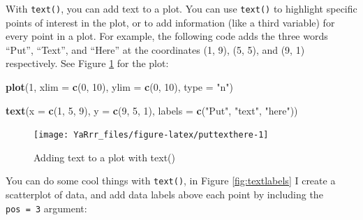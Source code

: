 \documentclass[]{book}
\newenvironment{Shaded}{\begin{snugshade}}{\end{snugshade}}
\newcommand{\KeywordTok}[1]{\textcolor[rgb]{0.13,0.29,0.53}{\textbf{#1}}}
\newcommand{\DataTypeTok}[1]{\textcolor[rgb]{0.13,0.29,0.53}{#1}}
\newcommand{\DecValTok}[1]{\textcolor[rgb]{0.00,0.00,0.81}{#1}}
\newcommand{\StringTok}[1]{\textcolor[rgb]{0.31,0.60,0.02}{#1}}
\newcommand{\NormalTok}[1]{#1}
\theoremstyle{definition}
\theoremstyle{definition}
\theoremstyle{remark}
\begin{document}
With \texttt{text()}, you can add text to a plot. You can use
\texttt{text()} to highlight specific points of interest in the plot, or
to add information (like a third variable) for every point in a plot.
For example, the following code adds the three words ``Put'', ``Text'',
and ``Here'' at the coordinates (1, 9), (5, 5), and (9, 1) respectively.
See Figure \ref{fig:puttexthere} for the plot:

\begin{Shaded}
\begin{Highlighting}[]
\KeywordTok{plot}\NormalTok{(}\DecValTok{1}\NormalTok{, }
     \DataTypeTok{xlim =} \KeywordTok{c}\NormalTok{(}\DecValTok{0}\NormalTok{, }\DecValTok{10}\NormalTok{), }
     \DataTypeTok{ylim =} \KeywordTok{c}\NormalTok{(}\DecValTok{0}\NormalTok{, }\DecValTok{10}\NormalTok{), }
     \DataTypeTok{type =} \StringTok{"n"}\NormalTok{)}

\KeywordTok{text}\NormalTok{(}\DataTypeTok{x =} \KeywordTok{c}\NormalTok{(}\DecValTok{1}\NormalTok{, }\DecValTok{5}\NormalTok{, }\DecValTok{9}\NormalTok{),}
     \DataTypeTok{y =} \KeywordTok{c}\NormalTok{(}\DecValTok{9}\NormalTok{, }\DecValTok{5}\NormalTok{, }\DecValTok{1}\NormalTok{),}
     \DataTypeTok{labels =} \KeywordTok{c}\NormalTok{(}\StringTok{"Put"}\NormalTok{, }\StringTok{"text"}\NormalTok{, }\StringTok{"here"}\NormalTok{))}
\end{Highlighting}
\end{Shaded}

\begin{figure}

{\centering \texttt{[image: YaRrr\_files/figure-latex/puttexthere-1]} 

}

\caption{Adding text to a plot with text()}\label{fig:puttexthere}
\end{figure}

You can do some cool things with \texttt{text()}, in Figure
\ref{fig:textlabels} I create a scatterplot of data, and add data labels
above each point by including the \texttt{pos\ =\ 3} argument:
\end{document}
